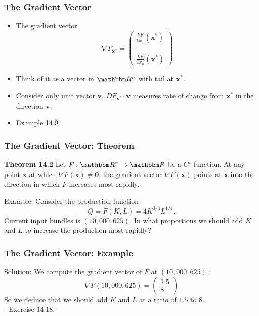 \documentclass[9pt,aspectratio=169]{beamer}
\newcommand{\RR}{\mathbbm R}
\begin{document}
\begin{frame}
	\frametitle{The Gradient Vector}
	\begin{itemize}
		\item The gradient vector 
		$$\nabla F_{\mathbf{x^*}} = \left(\begin{array}{c}
		\frac{\partial F}{\partial x_1}(\mathbf{x^*})\\
		\vdots\\
		\frac{\partial F}{\partial x_n}(\mathbf{x^*})\end{array}
		\right)$$ 
		\item Think of it as a vector in $\RR^n$ with tail at $\mathbf{x^*}$.  
		\item Consider only unit vector $\mathbf{v}$, $DF_{\mathbf{x^*}}\cdot\mathbf{v}$ measures rate of change from $\mathbf{x^*}$ in the direction $\mathbf{v}$.
		\item Example 14.9.
	\end{itemize}
\end{frame}

\begin{frame}
	\frametitle{The Gradient Vector: Theorem}
	\begin{block}{\textbf{Theorem 14.2}}
		Let $F: \RR^n\to \RR$ be a $C^1$ function. At
        any point $\mathbf{x}$ at which $\nabla F(\mathbf{x})\neq
        \mathbf{0}$, the gradient vector $ \nabla F(\mathbf x)$ points at
        $\mathbf{x}$ into the direction in which $F$ increases most rapidly.
	\end{block} 
	Example: Consider the production function $$Q = F(K,L) = 4K^{3/4}L^{1/4}.$$
	Current input bundles is $(10,000,625)$. In what proportions we should add $K$ and $L$ to increase the production most rapidly?
\end{frame}

\begin{frame}
	\frametitle{The Gradient Vector: Example}
	Solution: We compute the gradient vector of $F$ at $(10,000,625)$ :
	$$\nabla F(10,000,625) = \left(\begin{array}{c}
	1.5\\
	8 \end{array}
	\right)$$ 
	So we deduce that we should add $K$ and $L$ at a ratio of $1.5$ to $8$. \\ 
	
	- Exercise 14.18. 
\end{frame}
\end{document}

